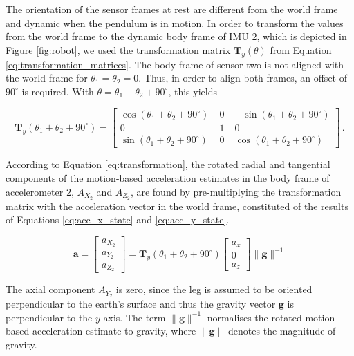 The orientation of the sensor frames at rest are different from the world frame and dynamic when the pendulum is in motion. In order to transform the values from the world frame to the dynamic body frame of \gls{IMU} $2$, which is depicted in Figure \ref{fig:robot}, we used the transformation matrix $\mathbf{T}_y(\theta)$ from Equation \ref{eq:transformation_matrices}. The body frame of sensor two is not aligned with the world frame for $\theta_1 = \theta_2 = 0$. Thus, in order to align both frames, an offset of $90^{\circ}$ is required. With $\theta = \theta_1 + \theta_2 + 90^{\circ}$, this yields

\begin{equation}
\mathbf{T}_y(\theta_1 + \theta_2 + 90^{\circ}) = \left[ \begin{smallmatrix}
    \cos (\theta_1 + \theta_2 + 90^{\circ}) \; & 0 \; & -\sin (\theta_1 + \theta_2 + 90^{\circ}) \\
    0 \; & 1 \; & 0 \\
    \sin (\theta_1 + \theta_2 + 90^{\circ}) \; & 0 \; & \cos (\theta_1 + \theta_2 + 90^{\circ})
    \end{smallmatrix} \right] \,.
\end{equation}

\noindent
According to Equation \ref{eq:transformation}, the rotated radial and tangential components of the motion-based acceleration estimates in the body frame of accelerometer $2$, $A_{X_2}$ and $A_{Z_2}$, are found by pre-multiplying the transformation matrix with the acceleration vector in the world frame, constituted of the results of Equations \ref{eq:acc_x_state} and \ref{eq:acc_y_state}.

\begin{equation}
  \mathbf{a} = \begin{bmatrix}
  	a_{X_2} \\
  	a_{Y_2} \\
  	a_{Z_2}
  \end{bmatrix} = \mathbf{T}_y(\theta_1 + \theta_2 + 90^{\circ}) \begin{bmatrix}
  	a_x \\
  	0 \\
	a_z
  \end{bmatrix} \|\mathbf{g}\|^{-1}
\end{equation}

\noindent
The axial component $A_{Y_2}$ is zero, since the leg is assumed to be oriented perpendicular to the earth's surface and thus the gravity vector $\mathbf{g}$ is perpendicular to the $y$-axis. The term $\|\mathbf{g}\|^{-1}$ normalises the rotated motion-based acceleration estimate to gravity, where $\|\mathbf{g}\|$ denotes the magnitude of gravity. 

